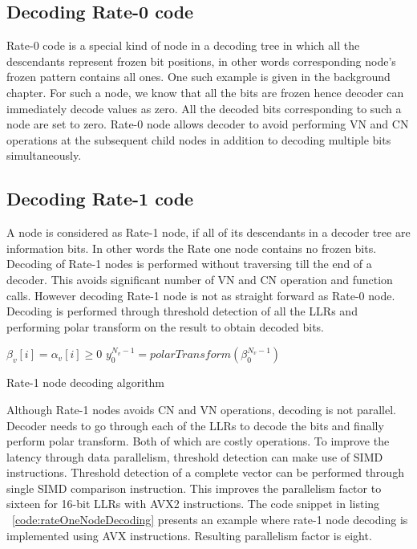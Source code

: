 \subsection{Decoding Rate-0 code}
Rate-0 code is a special kind of node in a decoding tree in which all the descendants represent frozen bit positions, in other words corresponding node's frozen pattern contains all ones. One such example is given in the background chapter. For such a node, we know that all the bits are frozen hence decoder can immediately decode values as zero. All the decoded bits corresponding to such a node are set to zero. Rate-0 node allows decoder to avoid performing VN and CN operations at the subsequent child nodes in addition to decoding multiple bits simultaneously.

\subsection{Decoding Rate-1 code}
A node is considered as Rate-1 node, if all of its descendants in a decoder tree are information bits. In other words the Rate one node contains no frozen bits. Decoding of Rate-1 nodes is performed without traversing till the end of a decoder. This avoids significant number of VN and CN operation and function calls. However decoding Rate-1 node is not as straight forward as Rate-0 node. Decoding is performed through threshold detection of all the LLRs and performing polar transform on the result to obtain decoded bits.

\IncMargin{1.5em}
\begin{algorithm}[]
	 {
		 {
			$\beta_{v}[i] = \alpha_{v}[i] \ge 0$\;
		}
		$y_{0}^{N_v-1} = polarTransform(\beta_{0}^{N_v-1})$ \;
	}
	\caption{Rate-1 node decoding algorithm}
	\label{algo:R1Decoding}
\end{algorithm}
\DecMargin{1.5em}

Although Rate-1 nodes avoids CN and VN operations, decoding is not parallel. Decoder needs to go through each of the LLRs to decode the bits and finally perform polar transform. Both of which are costly operations. To improve the latency through data parallelism, threshold detection can make use of SIMD instructions. Threshold detection of a complete vector can be performed through single SIMD comparison instruction. This improves the parallelism factor to sixteen for 16-bit LLRs with {AVX2} instructions. The code snippet in listing ~\ref{code:rateOneNodeDecoding} presents an example where rate-1 node decoding is implemented using AVX instructions. Resulting parallelism factor is eight. \newpage

